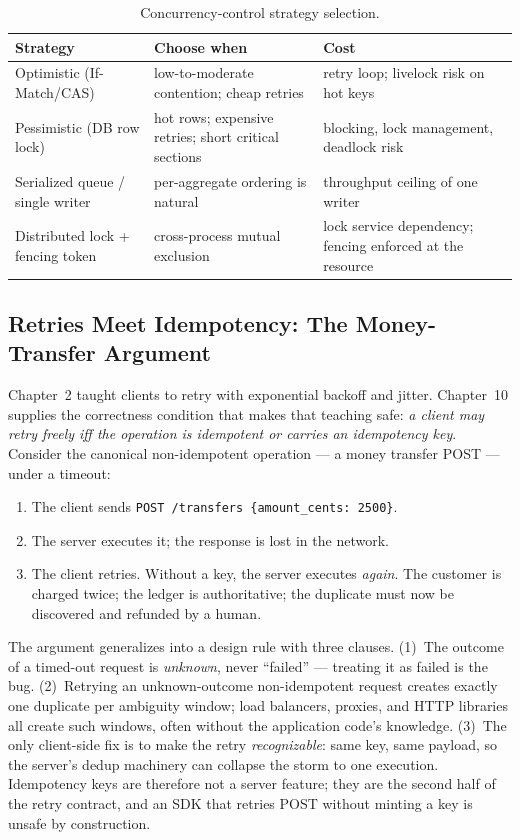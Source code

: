 \begin{table}[h]
  \centering
  \small
  \begin{tabularx}{\textwidth}{l X X}
    \toprule
    \textbf{Strategy} & \textbf{Choose when} & \textbf{Cost} \\
    \midrule
    Optimistic (If-Match/CAS) & low-to-moderate contention; cheap retries & retry loop; livelock risk on hot keys \\
    Pessimistic (DB row lock) & hot rows; expensive retries; short critical sections & blocking, lock management, deadlock risk \\
    Serialized queue / single writer & per-aggregate ordering is natural & throughput ceiling of one writer \\
    Distributed lock + fencing token & cross-process mutual exclusion & lock service dependency; fencing enforced at the resource \\
    \bottomrule
  \end{tabularx}
  \caption{Concurrency-control strategy selection.}
  \label{tab:ch10-strategies}
\end{table}

\subsection{Retries Meet Idempotency: The Money-Transfer Argument}
\label{sec:ch10-retries}

Chapter~2 taught clients to retry with exponential backoff and jitter.
Chapter~10 supplies the correctness condition that makes that teaching safe:
\emph{a client may retry freely iff the operation is idempotent or carries
an idempotency key}. Consider the canonical non-idempotent operation --- a
money transfer POST --- under a timeout:

\begin{enumerate}
  \item The client sends \texttt{POST /transfers \{amount\_cents: 2500\}}.
  \item The server executes it; the response is lost in the network.
  \item The client retries. Without a key, the server executes \emph{again}.
        The customer is charged twice; the ledger is authoritative; the
        duplicate must now be discovered and refunded by a human.
\end{enumerate}

The argument generalizes into a design rule with three clauses. (1)~The
outcome of a timed-out request is \emph{unknown}, never ``failed'' ---
treating it as failed is the bug. (2)~Retrying an unknown-outcome
non-idempotent request creates exactly one duplicate per ambiguity window;
load balancers, proxies, and HTTP libraries all create such windows, often
without the application code's knowledge. (3)~The only client-side fix is to
make the retry \emph{recognizable}: same key, same payload, so the server's
dedup machinery can collapse the storm to one execution. Idempotency keys
are therefore not a server feature; they are the second half of the retry
contract, and an SDK that retries POST without minting a key is unsafe by
construction.


